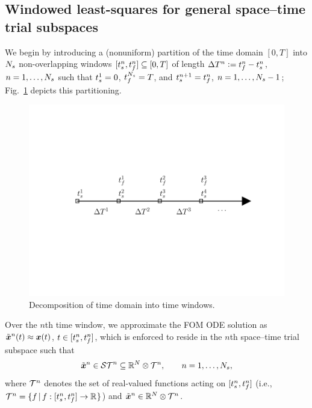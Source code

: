 \subsection{Windowed least-squares for general space--time trial subspaces} 
We begin by introducing a (nonuniform) partition of the time domain $[0,T]$
into $N_s$ non-overlapping windows $[t_s^{n} ,
t_f^{n}]\subseteq[0,T]$ of length $\Delta T^{n}\vcentcolon=t_f^{n} -
t_s^{n}$, $n=1,\ldots,N_s$ such that 
$t_s^{1} = 0$, $t_f^{N_s} = T$, and
$t_s^{n+1} = t_f^{n}$,
$n=1,\ldots,N_s-1$; Fig.~\ref{fig:slab_fig} depicts this partitioning.
\begin{figure} 
\begin{centering} 
\includegraphics[trim={0.0cm 5cm 0cm 3cm},clip,width=1.0\textwidth]{figs/time_grid.pdf} \caption{Decomposition of time
domain into time windows.} \label{fig:slab_fig} \end{centering} 
\end{figure}
Over the $n$th time window, we approximate the FOM ODE solution as 
$\tilde{\boldsymbol x}^n(t)\approx {\boldsymbol x}(t)$,
$t\in[t_s^{n},t_f^{n}]$, which is enforced to reside in 
the $n$th space--time trial subspace such that
\begin{equation}
\tilde{\boldsymbol x}^n \in \mathcal{ ST }^n \subseteq \mathbb{R}^{N} \otimes \mathcal{T}^{n} , \qquad  n = 1,\ldots,N_s,
\end{equation}
where $\mathcal{T}^{n}$ denotes the set of real-valued functions acting on
$[t_s^{n},t_f^{n}]$ (i.e., $\mathcal{T}^{n} = \{f\,|\,f:[t_s^{n},t_f^{n}]\rightarrow\mathbb{R}^{}\}$)
and
$\tilde{\boldsymbol x}^n \in\mathbb{R}^{N}\otimes\mathcal{T}^{n}$. 

